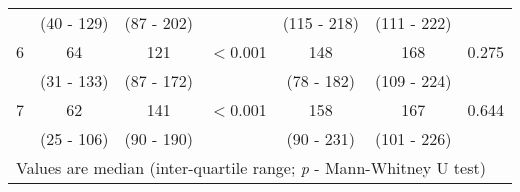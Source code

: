 \begin{table}[h]
\begin{tabular}{| c | c c c | c c c |}
		           & (40 - 129)  & (87 - 202)  &                 & (115 - 218)  & (111 - 222) &  \\
		6          & 64          & 121         & $<$0.001        & 148          & 168         & 0.275          \\
		           & (31 - 133)  & (87 - 172)  &                 & (78 - 182)   & (109 - 224) &  \\
		7          & 62          & 141         & $<$0.001        & 158          & 167         & 0.644          \\
		           & (25 - 106)  & (90 - 190)  &                 & (90 - 231)   & (101 - 226) &  \\ \hline
		\multicolumn{7}{l}{Values are median (inter-quartile range; \textit{p} - Mann-Whitney U test)}                                           \\
	\end{tabular}
\end{table}